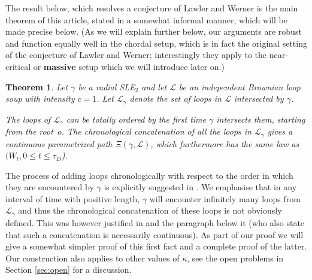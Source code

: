\documentclass[11pt]{article}
\newtheorem{theorem}{Theorem}[section]
\def\cL{{\mathcal L}}
\def\Att{{\Xi}}
\begin{document}
The result below, which resolves a conjecture of Lawler and Werner \cite[Conjecture 1]{LawlerWerner} is the main theorem of this article, stated in a somewhat informal manner, which will be made precise below. (As we will explain further below, our arguments are robust and function equally well in the chordal setup, which is in fact the original setting of the conjecture of Lawler and Werner; interestingly they  apply to the near-critical or \textbf{massive} setup which we will introduce later on.) 



\begin{theorem}\label{thm:main_intro}
  Let $\gamma$ be a radial SLE$_2$ and let $\cL$ be an independent Brownian loop soup with intensity $c = 1$. Let $\cL_\gamma$ denote the set of loops in $\cL$ intersected by $\gamma$.

  The loops of $\cL_\gamma$ can be totally ordered by the first time $\gamma$ intersects them, starting from the root~$o$. The chronological concatenation of all the loops in $\cL_\gamma$ gives a continuous parametrized path $\Att(\gamma,\mathcal{L})$, which furthermore has the same law as $(W_t, 0 \le t \le \tau_D$).
\end{theorem}



The process of adding loops chronologically with respect to the order in which they are encountered by $\gamma$ is explicitly suggested in \cite{LawlerWerner}. We emphasise that in any interval of time with positive length, $\gamma$ will encounter infinitely many loops from $\cL_\gamma$ and thus the chronological concatenation of these loops is not obviously defined. This was however justified in \cite[Lemma 13]{LawlerWerner} and the paragraph below it (who also state that such a concatenation is necessarily continuous). As part of our proof we will give a somewhat simpler proof of this first fact and a complete proof of the latter. Our construction also applies to other values of $\kappa$, see the open problems in Section \ref{sec:open} for a discussion.
\end{document}
